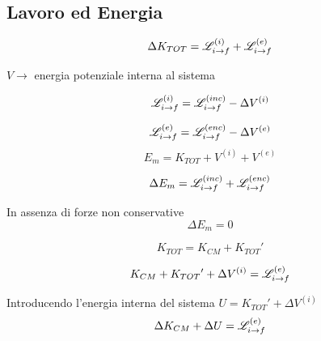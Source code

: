 \subsection{Lavoro ed Energia}

\begin{equation*}
    \Delta K_{TOT} = \mathscr{L}^{(i)}_{{i} \to {f}} + \mathscr{L}^{(e)}_{{i} \to {f}}
\end{equation*}

$V \to$ energia potenziale interna al sistema 

\begin{equation*}
    \mathscr{L}^{(i)}_{{i} \to {f}} = \mathscr{L}^{(inc)}_{{i} \to f} - \Delta V^{(i)}
\end{equation*}

\begin{equation*}
    \mathscr{L}^{(e)}_{{i} \to {f}} = \mathscr{L}^{(enc)}_{{i} \to f} - \Delta V^{(e)}
\end{equation*}
\vspace{\baselineskip}
\begin{equation*}
    E_m = K_{TOT} + V^{(i)} + V^{(e)}
\end{equation*}

\begin{equation*}
    \Delta E_m = \mathscr{L}^{(inc)}_{{i} \to {f}} + \mathscr{L}^{(enc)}_{{i} \to {f}}
\end{equation*}


In assenza di forze non conservative
\begin{equation*}
    \Delta E_m = 0
\end{equation*}

\vspace{\baselineskip}

\begin{equation*}
    K_{TOT} = K_{CM} + K_{TOT}{'}
\end{equation*}

\begin{equation*}
    K_{CM} + K_{TOT}{'} + \Delta V^{(i)} = \mathscr{L}^{(e)}_{i \to f}
\end{equation*}

Introducendo l'energia interna del sistema $U=K_{TOT}{'} + \Delta V^{(i)}$
\begin{equation}
    \Delta K_{CM} + \Delta U = \mathscr{L}^{(e)}_{i \to f}
\end{equation}